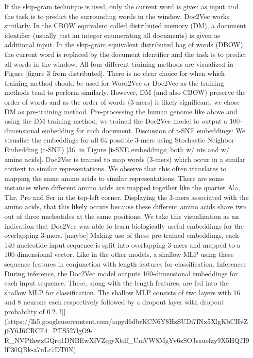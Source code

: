 If the skip-gram technique is used, only the current word is given as input and the task is to predict the surrounding words in the window. Doc2Vec works similarly. In the CBOW equivalent called distributed memory (DM), a document identifier (usually just an integer enumerating all documents) is given as additional input. In the skip-gram equivalent distributed bag of words (DBOW), the current word is replaced by the document identifier and the task is to predict all words in the window. All four different training methods are visualized in Figure [figure 3 from distributed].
There is no clear choice for when which training method should be used for Word2Vec or Doc2Vec as the training methods tend to perform similarly. However, DM (and also CBOW) preserve the order of words and as the order of words (3-mers) is likely significant, we chose DM as pre-training method.
Pre-processing the human genome like above and using the DM training method, we trained the Doc2Vec model to output a 100-dimensional embedding for each document.
Discussion of t-SNE embeddings:
We visualize the embeddings for all 64 possible 3-mers using Stochastic Neighbor Embedding (t-SNE) [36] in Figure [t-SNE embeddings; both w/ nts and w/ amino acids].
Doc2Vec is trained to map words (3-mers) which occur in a similar context to similar representations. We observe that this often translates to mapping the same amino acids to similar representations. There are some instances when different amino acids are mapped together like the quartet Ala, Thr, Pro and Ser in the top-left corner. Displaying the 3-mers associated with the amino acids, that this likely occurs because these different amino acids share two out of three nucleotides at the same positions. We take this visualization as an indication that Doc2Vec was able to learn biologically useful embeddings for the overlapping 3-mers.
[maybe] Making use of these pre-trained embeddings, each 140 nucleotide input sequence is split into overlapping 3-mers and mapped to a 100-dimensional vector. Like in the other models, a shallow MLP using these sequence features in conjunction with length features for classification.
Inference:
During inference, the Doc2Vec model outputs 100-dimensional embeddings for each input sequence. These, along with the length features, are fed into the shallow MLP for classification. The shallow MLP consists of two layers with 16 and 8 neurons each respectively followed by a dropout layer with dropout probability of 0.2.
![](https://lh5.googleusercontent.com/iapyd6dbrKCN6Y8HzSUDi7fNx5XlgKbCHvZj6Y6J6CRCF4_PTS527lgO9-R_NVPthwxGQrq1DNBEwXfVZqjyXtdf_UmVW8MgYv6zSOJsauefzy9X5HQJI9lF30QBk-a7uLc7DT0N)
